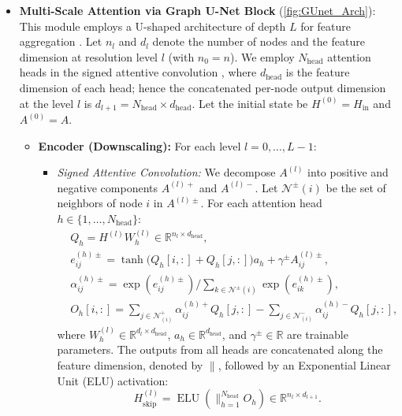 \documentclass{article}
\theoremstyle{definition}
\theoremstyle{remark}
\begin{document}
\begin{itemize}
    \item \textbf{Multi-Scale Attention via Graph U-Net Block} (\cref{fig:GUnet_Arch}): 
    This module employs a U-shaped architecture of depth \(L\) for feature aggregation \cite{GUNET}.
    Let \(n_l\) and \(d_l\) denote the number of nodes and the feature dimension at resolution level \(l\) (with \(n_0=n\)).
    We employ \(N_{\mathrm{head}}\) attention heads in the signed attentive convolution \cite{huang2019signed}, where \(d_{\mathrm{head}}\) is the feature dimension of each head; hence the concatenated per-node output dimension at the level \(l\) is \(d_{l+1}=N_{\mathrm{head}}\times d_{\mathrm{head}}\).
    Let the initial state be \(H^{(0)} = H_{\mathrm{in}}\) and \(A^{(0)} = A\).
    
    \begin{itemize}
        \item \textbf{Encoder (Downscaling):} For each level \(l = 0, \dots, L-1\):
        \begin{itemize}
            \item \textit{Signed Attentive Convolution:} We decompose \(A^{(l)}\) into positive and negative components \(A^{(l)+} \) and \(A^{(l)-}\). Let \(\mathcal{N}^{\pm}(i)\) be the set of neighbors of node \(i\) in \(A^{(l)\pm}\). For each attention head \(h \in \{1, \dots, N_{\mathrm{head}}\}\):
            \begin{equation*}
            \begin{aligned}
                &Q_h = H^{(l)} W_h^{(l)} \in \mathbb{R}^{n_l \times d_{\mathrm{head}}}, \\
                &e_{ij}^{(h)\pm} = \tanh \big(Q_h[i,:] + Q_h[j,:]\big)  a_h + \gamma^{\pm} A^{(l)\pm}_{ij}, \\
                &\alpha_{ij}^{(h)\pm} = \exp(e_{ij}^{(h)\pm})/\sum_{k \in \mathcal{N}^{\pm}(i)} \exp(e_{ik}^{(h)\pm}), \\
                &O_h[i,:] = \sum_{j \in \mathcal{N}^{+}_{(i)}} \alpha_{ij}^{(h)+} Q_h[j,:] - \sum_{j \in \mathcal{N}^{-}_{(i)}} \alpha_{ij}^{(h)-} Q_h[j,:],
            \end{aligned}
            \end{equation*}
            where \(W_h^{(l)} \in \mathbb{R}^{d_l \times d_{\mathrm{head}}}\), \(a_h \in \mathbb{R}^{d_{\mathrm{head}}}\), and \(\gamma^{\pm} \in \mathbb{R}\) are trainable parameters. The outputs from all heads are concatenated along the feature dimension, denoted by \(\parallel\), followed by an Exponential Linear Unit (ELU) activation:
            \[
                H_{\mathrm{skip}}^{(l)} = \operatorname{ELU}\!\left( \big\|_{h=1}^{N_{\mathrm{head}}} O_h \right) \in \mathbb{R}^{n_l \times d_{l+1}}.
            \]
            

\end{itemize}
\end{itemize}
\end{itemize}
\end{document}
